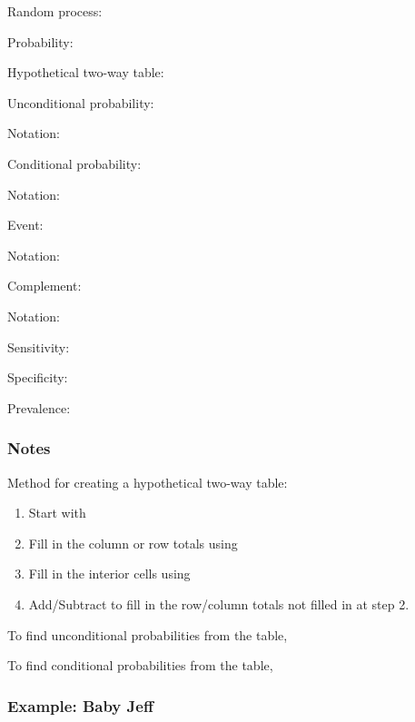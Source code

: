 \documentclass[
]{report}
\newcommand{\rgs}{\vspace{12pt}} %
\newcommand{\rgi}{\hspace{24pt}}  %
\begin{document}
Random process:
\rgs

Probability:
\rgs

Hypothetical two-way table:
\rgs

Unconditional probability:
\rgs

\rgi Notation:
\rgs

Conditional probability:
\rgs

\rgi Notation:
\rgs

Event:
\rgs

\rgi Notation:
\rgs

Complement:
\rgs

\rgi Notation:
\rgs

Sensitivity:
\rgs

Specificity:
\rgs

Prevalence:
\rgs

\hypertarget{notes-5}{%
\subsubsection*{Notes}\label{notes-5}}

Method for creating a hypothetical two-way table:

\begin{enumerate}
\def\labelenumi{\arabic{enumi}.}
\item
  Start with
  \rgs
\item
  Fill in the column or row totals using
  \rgs
\item
  Fill in the interior cells using
  \rgs
\item
  Add/Subtract to fill in the row/column totals not filled in at step 2.
\end{enumerate}

\rgi \rgi To find unconditional probabilities from the table,
\rgs

\rgi \rgi To find conditional probabilities from the table,
\rgs

\hypertarget{example-baby-jeff}{%
\subsubsection*{Example: Baby Jeff}\label{example-baby-jeff}}
\end{document}
